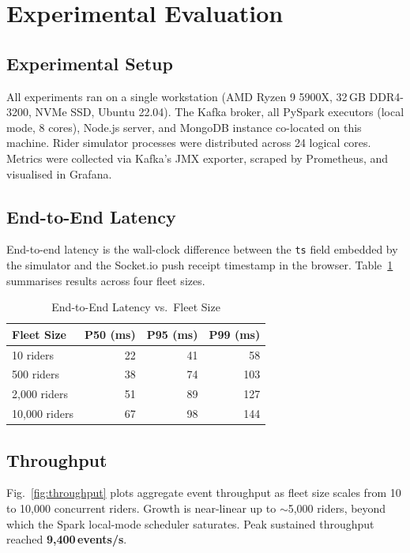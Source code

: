 \documentclass[conference]{IEEEtran}
\begin{document}
\section{Experimental Evaluation}
\label{sec:evaluation}

\subsection{Experimental Setup}

All experiments ran on a single workstation (AMD Ryzen 9 5900X,
32\,GB DDR4-3200, NVMe SSD, Ubuntu 22.04). The Kafka broker, all
PySpark executors (local mode, 8 cores), Node.js server, and
MongoDB instance co-located on this machine. Rider simulator processes
were distributed across 24 logical cores. Metrics were collected
via Kafka's JMX exporter, scraped by Prometheus, and visualised in
Grafana.

\subsection{End-to-End Latency}

End-to-end latency is the wall-clock difference between the \texttt{ts}
field embedded by the simulator and the Socket.io push receipt timestamp
in the browser. Table~\ref{tab:latency} summarises results across four
fleet sizes.

\begin{table}[htbp]
  \centering
  \caption{End-to-End Latency vs.\ Fleet Size}
  \label{tab:latency}
  \begin{tabular}{@{}lrrr@{}}
    \toprule
    \textbf{Fleet Size} & \textbf{P50 (ms)} & \textbf{P95 (ms)} &
    \textbf{P99 (ms)} \\
    \midrule
    10 riders     &  22 &  41 &  58 \\
    500 riders    &  38 &  74 & 103 \\
    2{,}000 riders &  51 &  89 & 127 \\
    10{,}000 riders &  67 &  98 & 144 \\
    \bottomrule
  \end{tabular}
\end{table}

\subsection{Throughput}

Fig.~\ref{fig:throughput} plots aggregate event throughput as fleet
size scales from 10 to 10,000 concurrent riders. Growth is near-linear
up to $\sim$5,000 riders, beyond which the Spark local-mode scheduler
saturates. Peak sustained throughput reached \textbf{9,400\,events/s}.
\end{document}
